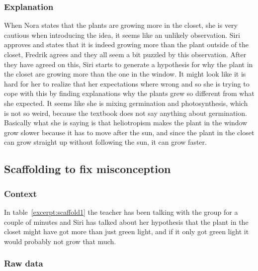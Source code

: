 \subsubsection*{Explanation}
When Nora states that the plants are growing more in the closet, she is very cautious when introducing the idea, it seems like an unlikely observation. Siri approves and states that it is indeed growing more than the plant outside of the closet, Fredrik agrees and they all seem a bit puzzled by this observation.
After they have agreed on this, Siri starts to generate a hypothesis for why the plant in the closet are growing more than the one in the window. It might look like it is hard for her to realize that her expectations where wrong and so she is trying to cope with this by finding explanations why the plants grew so different from what she expected. It seems like she is mixing germination and photosynthesis, which is not so weird, because the textbook does not say anything about germination. 
Basically what she is saying is that heliotropism makes the plant in the window grow slower because it has to move after the sun, and since the plant in the closet can grow straight up without following the sun, it can grow faster. 

\subsection{Scaffolding to fix misconception}

\subsubsection*{Context}
In table~\ref{excerpt:scaffold1} the teacher has been talking with the group for a couple of minutes and Siri has talked about her hypothesis that the plant in the closet might have got more than just green light, and if it only got green light it would probably not grow that much.
 
\subsubsection*{Raw data}

